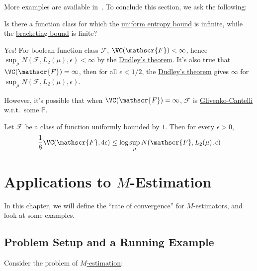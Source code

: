 More examples are available in~\cite{vandervaartWeakConvergenceEmpirical1996}. To conclude this section, we ask the following:

\begin{problem}
Is there a function class for which the \hyperref[thm:uniform-entropy-integral-bound]{uniform entropy bound} is infinite, while the \hyperref[thm:bracketing-bound]{bracketing bound} is finite?
\end{problem}
\begin{answer}
	Yes! For boolean function class \(\mathscr{F} \), \(\VC(\mathscr{F} ) < \infty \), hence \(\sup _\mu N(\mathscr{F} , L_2(\mu ), \epsilon ) < \infty \) by the \hyperref[thm:Dudley]{Dudley's theorem}. It's also true that \(\VC(\mathscr{F} ) = \infty \), then for all \(\epsilon < 1 / 2\), the \hyperref[thm:Dudley]{Dudley's theorem} gives \(\infty \) for \(\sup _\mu N(\mathscr{F} , L_2(\mu ), \epsilon )\).

	However, it's possible that when \(\VC(\mathscr{F} ) = \infty \), \(\mathscr{F} \) is \hyperref[def:Glivenko-Cantelli]{Glivenko-Cantelli} w.r.t.\ some \(\mathbb{P} \).
\end{answer}


\begin{lemma}
	Let \(\mathscr{F} \) be a class of function uniformly bounded by \(1\). Then for every \(\epsilon > 0\),
	\[
		\frac{1}{8}\VC(\mathscr{F} , 4\epsilon )
		\leq \log \sup _\mu N(\mathscr{F} , L_2(\mu ), \epsilon )
	\]
\end{lemma}

\chapter{Applications to \(M\)-Estimation}
In this chapter, we will define the ``rate of convergence'' for \(M\)-estimators, and look at some examples.

\section{Problem Setup and a Running Example}
Consider the problem of \hyperref[prb:M-estimation]{\(M\)-estimation}:

